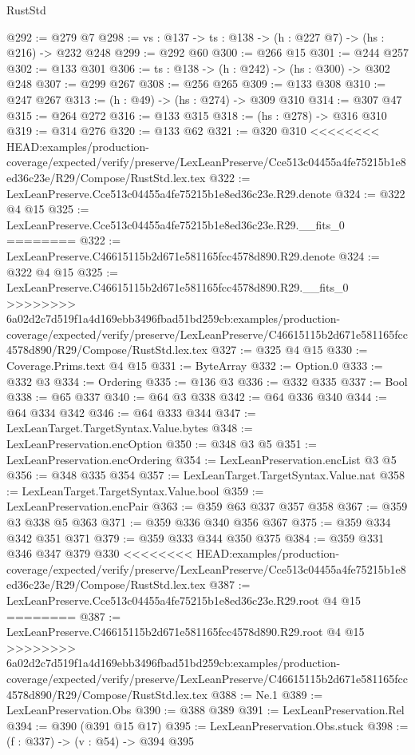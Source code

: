 \begin{lexlean}{RustStd}
\begin{coremodule}
{\begin{coremodule}
@292 := @279 @7
@298 := {vs : @137} -> {ts : @138} -> (h : @227 @7) -> (hs : @216) -> @232 @248
@299 := @292 @60
@300 := @266 @15
@301 := @244 @257
@302 := @133 @301
@306 := {ts : @138} -> (h : @242) -> (hs : @300) -> @302 @248
@307 := @299 @267
@308 := @256 @265
@309 := @133 @308
@310 := @247 @267
@313 := (h : @49) -> (hs : @274) -> @309 @310
@314 := @307 @47
@315 := @264 @272
@316 := @133 @315
@318 := (hs : @278) -> @316 @310
@319 := @314 @276
@320 := @133 @62
@321 := @320 @310
<<<<<<<< HEAD:examples/production-coverage/expected/verify/preserve/LexLeanPreserve/Cce513c04455a4fe75215b1e8ed36c23e/R29/Compose/RustStd.lex.tex
@322 := LexLeanPreserve.Cce513c04455a4fe75215b1e8ed36c23e.R29.denote
@324 := @322 @4 @15
@325 := LexLeanPreserve.Cce513c04455a4fe75215b1e8ed36c23e.R29.__fits_0
========
@322 := LexLeanPreserve.C46615115b2d671e581165fcc4578d890.R29.denote
@324 := @322 @4 @15
@325 := LexLeanPreserve.C46615115b2d671e581165fcc4578d890.R29.__fits_0
>>>>>>>> 6a02d2c7d519f1a4d169ebb3496fbad51bd259cb:examples/production-coverage/expected/verify/preserve/LexLeanPreserve/C46615115b2d671e581165fcc4578d890/R29/Compose/RustStd.lex.tex
@327 := @325 @4 @15
@330 := Coverage.Prims.text @4 @15
@331 := ByteArray
@332 := Option.{0}
@333 := @332 @3
@334 := Ordering
@335 := @136 @3
@336 := @332 @335
@337 := Bool
@338 := @65 @337
@340 := @64 @3 @338
@342 := @64 @336 @340
@344 := @64 @334 @342
@346 := @64 @333 @344
@347 := LexLeanTarget.TargetSyntax.Value.bytes
@348 := LexLeanPreservation.encOption
@350 := @348 @3 @5
@351 := LexLeanPreservation.encOrdering
@354 := LexLeanPreservation.encList @3 @5
@356 := @348 @335 @354
@357 := LexLeanTarget.TargetSyntax.Value.nat
@358 := LexLeanTarget.TargetSyntax.Value.bool
@359 := LexLeanPreservation.encPair
@363 := @359 @63 @337 @357 @358
@367 := @359 @3 @338 @5 @363
@371 := @359 @336 @340 @356 @367
@375 := @359 @334 @342 @351 @371
@379 := @359 @333 @344 @350 @375
@384 := @359 @331 @346 @347 @379 @330
<<<<<<<< HEAD:examples/production-coverage/expected/verify/preserve/LexLeanPreserve/Cce513c04455a4fe75215b1e8ed36c23e/R29/Compose/RustStd.lex.tex
@387 := LexLeanPreserve.Cce513c04455a4fe75215b1e8ed36c23e.R29.root @4 @15
========
@387 := LexLeanPreserve.C46615115b2d671e581165fcc4578d890.R29.root @4 @15
>>>>>>>> 6a02d2c7d519f1a4d169ebb3496fbad51bd259cb:examples/production-coverage/expected/verify/preserve/LexLeanPreserve/C46615115b2d671e581165fcc4578d890/R29/Compose/RustStd.lex.tex
@388 := Ne.{1}
@389 := LexLeanPreservation.Obs
@390 := @388 @389
@391 := LexLeanPreservation.Rel
@394 := @390 (@391 @15 @17)
@395 := LexLeanPreservation.Obs.stuck
@398 := (f : @337) -> (v : @54) -> @394 @395

\end{coremodule}}
\end{coremodule}
\end{lexlean}

